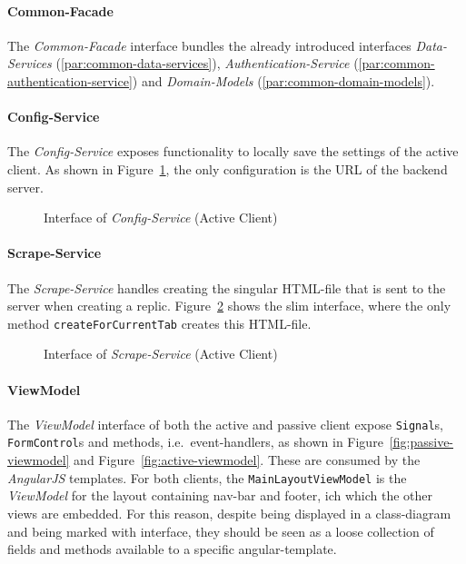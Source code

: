 \paragraph{Common-Facade}
The \textit{Common-Facade} interface bundles the already introduced interfaces \textit{Data-Services} (\ref{par:common-data-services}), \textit{Authentication-Service} (\ref{par:common-authentication-service}) and \textit{Domain-Models} (\ref{par:common-domain-models}).

\paragraph{Config-Service}\label{par:active-config-service}
The \textit{Config-Service} exposes functionality to locally save the settings of the active client.
As shown in Figure~\ref{fig:active-config-service}, the only configuration is the URL of the backend server.

\begin{figure}
    \centering

    \caption{Interface of \textit{Config-Service} (Active Client)}
    \label{fig:active-config-service}
\end{figure}

\paragraph{Scrape-Service}\label{par:active-scrape-service}
The \textit{Scrape-Service} handles creating the singular HTML-file that is sent to the server when creating a replic.
Figure~\ref{fig:active-scrape-service} shows the slim interface, where the only method \texttt{createForCurrentTab} creates this HTML-file.

\begin{figure}
    \centering

    \caption{Interface of \textit{Scrape-Service} (Active Client)}
    \label{fig:active-scrape-service}
\end{figure}

\paragraph{ViewModel}\label{par:viewmodel}
The \textit{ViewModel} interface of both the active and passive client expose \texttt{Signal}s, \texttt{FormControl}s and methods, i.e.\ event-handlers, as shown in Figure~\ref{fig:passive-viewmodel} and Figure~\ref{fig:active-viewmodel}.
These are consumed by the \textit{AngularJS} templates.
For both clients, the \texttt{MainLayoutViewModel} is the \textit{ViewModel} for the layout containing nav-bar and footer, ich which the other views are embedded.
For this reason, despite being displayed in a class-diagram and being marked with \«interface\», they should be seen as a loose collection of fields and methods available to a specific angular-template.

